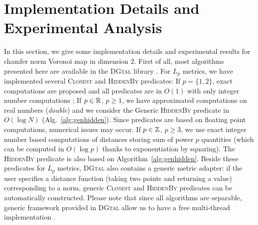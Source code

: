\documentclass{llncs}
\begin{document}


\section{Implementation Details and Experimental Analysis}
\label{sec:exper-analys}

In this section, we give some implementation details and experimental
results for chamfer norm Voronoi map in dimension 2.  First of all,
most algorithms presented here are available in the \textsc{DGtal}
library \cite{dgtal}. For $L_p$ metrics, we have implemented several
\textsc{Closest} and \textsc{HiddenBy} predicates: If $p=\{1,2\}$,
exact computations are proposed and all predicates are in $O(1)$ with
only integer number computations
\cite{Hirata,Maurer2003,roerdnik}; If $p\in {\mathbb{R}}$, $p\geq 1$, we
have approximated computations on real numbers (\emph{double}) and we
consider the Generic \textsc{HiddenBy} predicate in $O(\log N)$
(Alg.~\ref{alg:genhidden}). Since predicates are based on floating
point computations, numerical issues may occur. If $p\in {\mathbb{Z}}$, $p\geq
3$, we use exact integer number based computations of distances
storing sum of power $p$ quantities (which can be computed in
$O(\log{p})$ thanks to exponentiation by squaring). The
\textsc{HiddenBy} predicate is also based on
Algorithm~\ref{alg:genhidden}.
Beside these predicates for $L_p$ metrics, \textsc{DGtal} also
contains a generic metric adapter: if the user specifies a distance
function (taking two points and returning a value) corresponding to a
norm, generic \textsc{Closest} and \textsc{HiddenBy} predicates can be
automatically constructed. Please note that since all algorithms are
separable, generic framework provided in \textsc{DGtal} allow us to
have a free multi-thread implementation \cite{dcoeurjo_ChapDTWADGMM}.
\end{document}
